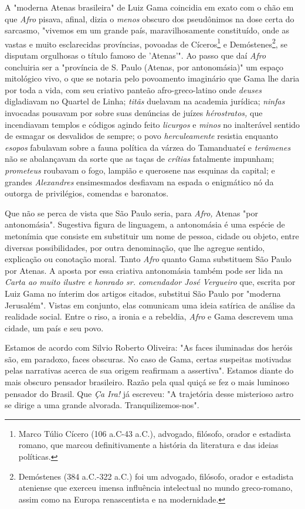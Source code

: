 A "moderna Atenas brasileira" de Luiz Gama coincidia em exato com o chão
em que \emph{Afro} pisava, afinal, dizia o \emph{menos} obscuro dos
pseudônimos na dose certa do sarcasmo, "vivemos em um grande país,
maravilhosamente constituído, onde as vastas e muito esclarecidas
províncias, povoadas de Cíceros\footnote{Marco Túlio Cícero (106
  a.C-43 a.C.), advogado, filósofo, orador e estadista romano, que
  marcou definitivamente a história da literatura e das ideias
  políticas.} e Demóstenes\footnote{Demóstenes (384 a.C.-322 a.C.) foi
  um advogado, filósofo, orador e estadista ateniense que exerceu imensa
  influência intelectual no mundo greco-romano, assim como na Europa
  renascentista e na modernidade.}, se disputam orgulhosas o título
famoso de 'Atenas'". Ao passo que daí \emph{Afro} concluiria ser a
"província de S. Paulo (Atenas, por antonomásia)" um espaço mitológico
vivo, o que se notaria pelo povoamento imaginário que Gama lhe daria por
toda a vida, com seu criativo panteão afro-greco-latino onde
\emph{deuses} digladiavam no Quartel de Linha; \emph{titãs} duelavam na
academia jurídica; \emph{ninfas} invocadas pousavam por sobre suas
denúncias de juízes \emph{hérostratos,} que incendiavam templos e
códigos agindo feito \emph{licurgos} e \emph{minos} no inalterável
sentido de esmagar os desvalidos de sempre; o povo \emph{herculeamente}
resistia enquanto \emph{esopos} fabulavam sobre a fauna política da
várzea do Tamanduateí e \emph{terâmenes} não se abalançavam da sorte que
as taças de \emph{crítias} fatalmente impunham; \emph{prometeus}
roubavam o fogo, lampião e querosene nas esquinas da capital; e grandes
\emph{Alexandres} ensimesmados desfiavam na espada o enigmático nó da
outorga de privilégios, comendas e baronatos.

Que não se perca de vista que São Paulo seria, para \emph{Afro,} Atenas
"por antonomásia". Sugestiva figura de linguagem, a antonomásia é uma
espécie de metonímia que consiste em substituir um nome de pessoa,
cidade ou objeto, entre diversas possibilidades, por outra denominação,
que lhe agregue sentido, explicação ou conotação moral. Tanto
\emph{Afro} quanto Gama substituem São Paulo por Atenas. A aposta por
essa criativa antonomásia também pode ser lida na \emph{Carta ao muito
ilustre e honrado sr. comendador José Vergueiro} que, escrita por Luiz
Gama no ínterim dos artigos citados, substitui São Paulo por "moderna
Jerusalém". Vistas em conjunto, elas comunicam uma ideia satírica de
análise da realidade social. Entre o riso, a ironia e a rebeldia,
\emph{Afro} e Gama descrevem uma cidade, um país e seu povo.

Estamos de acordo com Silvio Roberto Oliveira: "As faces iluminadas dos
heróis são, em paradoxo, faces obscuras. No caso de Gama, certas
suspeitas motivadas pelas narrativas acerca de sua origem reafirmam a
assertiva". Estamos diante do mais obscuro pensador brasileiro. Razão
pela qual quiçá se fez o mais luminoso pensador do Brasil. Que \emph{Ça
Ira!} já escreveu: "A trajetória desse misterioso astro se dirige a uma
grande alvorada. Tranquilizemos-nos".

